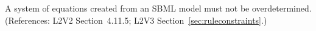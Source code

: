 A system of equations created from an SBML model must not be
overdetermined.  (References: L2V2 Section~4.11.5; L2V3
Section~\ref{sec:ruleconstraints}.)
